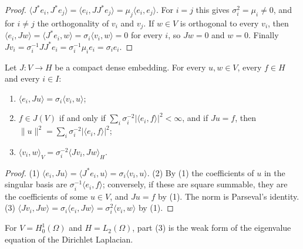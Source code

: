 \begin{proof}
\leanok
$\langle J^* e_i, J^* e_j \rangle = \langle e_i, J J^* e_j \rangle = \mu_j \langle e_i, e_j
\rangle$. For $i = j$ this gives $\sigma_i^2 = \mu_i \neq 0$, and for $i \neq j$ the
orthogonality of $v_i$ and $v_j$. If $w \in V$ is orthogonal to every $v_i$, then
$\langle e_i, J w \rangle = \langle J^* e_i, w \rangle = \sigma_i \langle v_i, w \rangle = 0$ for
every $i$, so $J w = 0$ and $w = 0$. Finally $J v_i = \sigma_i^{-1} J J^* e_i =
\sigma_i^{-1} \mu_i e_i = \sigma_i e_i$.
\end{proof}

\begin{lemma}
\label{lem:singular-coefficients}
\leanok
{}
Let $J : V \to H$ be a compact dense embedding. For every $u, w \in V$, every $f \in H$ and
every $i \in I$:
\begin{enumerate}
  \item $\langle e_i, J u \rangle = \sigma_i \langle v_i, u \rangle$;
  \item $f \in J(V)$ if and only if $\sum_i \sigma_i^{-2} |\langle e_i, f \rangle|^2 < \infty$,
    and if $J u = f$, then $\|u\|^2 = \sum_i \sigma_i^{-2} |\langle e_i, f \rangle|^2$;
  \item $\langle v_i, w \rangle_V = \sigma_i^{-2} \langle J v_i, J w \rangle_H$.
\end{enumerate}
\end{lemma}

\begin{proof}
\leanok
(1) $\langle e_i, J u \rangle = \langle J^* e_i, u \rangle = \sigma_i \langle v_i, u \rangle$.
(2) By (1) the coefficients of $u$ in the singular basis are
$\sigma_i^{-1} \langle e_i, f \rangle$; conversely, if these are square summable, they are the
coefficients of some $u \in V$, and $J u = f$ by (1). The norm is Parseval's identity.
(3) $\langle J v_i, J w \rangle = \sigma_i \langle e_i, J w \rangle = \sigma_i^2 \langle v_i, w
\rangle$ by (1).
\end{proof}

For $V = H^1_0(\Omega)$ and $H = L_2(\Omega)$, part (3) is the weak form of the eigenvalue
equation of the Dirichlet Laplacian.

